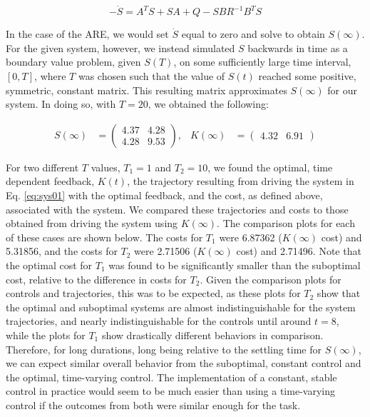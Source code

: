 \documentclass[12pt, notitlepage, letterpaper]{article}
\begin{document}
\begin{equation}
\label{eq: ric}
-\dot{S} = A^TS + SA + Q - SBR^{-1}B^TS
\end{equation}

In the case of the ARE, we would set $\dot{S}$ equal to zero and solve to obtain $S(\infty)$.  For the given system, however, we instead simulated $S$ backwards in time as a boundary value problem, given $S(T)$, on some sufficiently large time interval, $[0, T]$, where $T$ was chosen such that the value of $S(t)$ reached some positive, symmetric, constant matrix.  This resulting matrix approximates $S(\infty)$ for our system.  In doing so, with $T = 20$, we obtained the following:

\begin{align}
\label{eq: SKinf}
S(\infty) 
&=
\begin{pmatrix}
4.37 & 4.28 \\
4.28 & 9.53
\end{pmatrix}
,&
K(\infty)
&=
\begin{pmatrix}
4.32 & 6.91 
\end{pmatrix}
\end{align}

For two different $T$ values, $T_1 = 1$ and $T_2 = 10$, we found the optimal, time dependent feedback, $K(t)$, the trajectory resulting from driving the system in Eq. \ref{eq:sys01} with the optimal feedback, and the cost, as defined above, associated with the system.  We compared these trajectories and costs to those obtained from driving the system using $K(\infty)$.  The comparison plots for each of these cases are shown below.  The costs for $T_1$ were 6.87362 ($K(\infty)$ cost) and 5.31856, and the costs for $T_2$ were 2.71506 ($K(\infty)$ cost) and 2.71496.  Note that the optimal cost for $T_1$ was found to be significantly smaller than the suboptimal cost, relative to the difference in costs for $T_2$.  Given the comparison plots for controls and trajectories, this was to be expected, as these plots for $T_2$ show that the optimal and suboptimal systems are almost indistinguishable for the system trajectories, and nearly indistinguishable for the controls until around $t = 8$, while the plots for $T_1$ show drastically different behaviors in comparison.  Therefore, for long durations, long being relative to the settling time for $S(\infty)$, we can expect similar overall behavior from the suboptimal, constant control and the optimal, time-varying control.  The implementation of a constant, stable control in practice would seem to be much easier than using a time-varying control if the outcomes from both were similar enough for the task.
\end{document}
